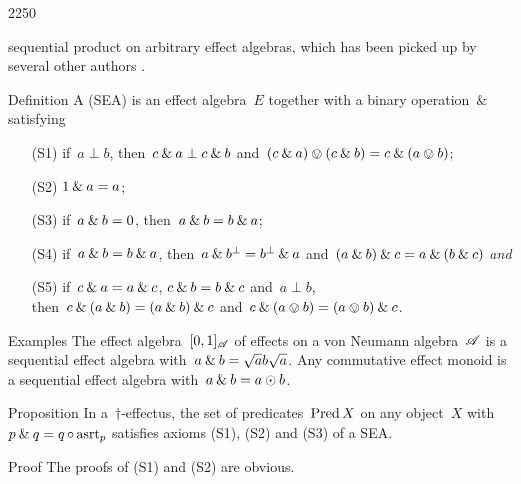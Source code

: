 \begin{parsec}{2250}
\begin{point}{10}
\begin{point}{30}
    sequential product on arbitrary effect algebras,
    which has been picked up by several other authors
    \cite{li2011sequential,gudder2005open,shen2009not,gudder2005uniqueness,jun2009remarks,weihua2009uniqueness,tkadlec2008atomic,jia2010entropy,arias2004almost,van2018three,weteringseqprod}.
\end{point}
\end{point}
\begin{point}{40}{Definition}%
A  (SEA)
    is an effect algebra~$E$ together
    with a binary operation~$\&$
    satisfying
\begin{enumerate}
    \item[(S1)] if~$a \perp b$,
        then~$c \mathbin{\&} a \perp c \mathbin{\&} b$
        and~$(c \mathbin{\&} a) \ovee (c \mathbin{\&} b)
                = c \mathbin{\&} (a \ovee b)$;
    \item[(S2)] $1 \mathbin{\&} a =a$;
    \item[(S3)] if~$a \mathbin{\&} b = 0$,
            then~$a \mathbin{\&} b = b \mathbin{\&} a$;
    \item[(S4)]
        if~$a \mathbin{\&} b = b \mathbin{\&} a$,
        then~$a \mathbin{\&} b^\perp = b^\perp \mathbin{\&} a$
        and~$(a \mathbin{\&} b) \mathbin{\&} c
            = a \mathbin{\&} (b \mathbin{\&} c) $ \emph{and}
    \item[(S5)]
        if~$c \mathbin{\&} a = a \mathbin{\&} c$,
        $c \mathbin{\&} b = b \mathbin{\&} c$ and~$a \perp b$,\\
        then~$c \mathbin{\&} (a \mathbin{\&} b)
                = (a \mathbin{\&} b) \mathbin{\&} c$
                and~$c \mathbin{\&} (a \ovee b) = (a \ovee b) \mathbin{\&} c$.
\end{enumerate}
\end{point}
\spacingfix{}
\begin{point}{50}{Examples}%
The effect algebra~$[0,1]_{\mathscr{A}}$
    of effects on a von Neumann algebra~$\mathscr{A}$
    is a sequential effect algebra with~$a \mathbin{\&} b = \sqrt{a}b\sqrt{a}$.
Any commutative effect monoid is a sequential effect algebra
    with~$a \mathbin{\&} b = a \odot b$.
\end{point}
\begin{point}{60}{Proposition}%
In a~$\dagger$-effectus,
    the set of predicates~$\operatorname{Pred} X$ on any object~$X$
    with~$p \mathbin{\&} q = q \mathop{\circ} \mathrm{asrt}_p$
    satisfies axioms (S1), (S2) and (S3) of a SEA.
\begin{point}{70}{Proof}%
The proofs of (S1) and (S2) are obvious.

\end{point}
\end{point}
\end{parsec}
